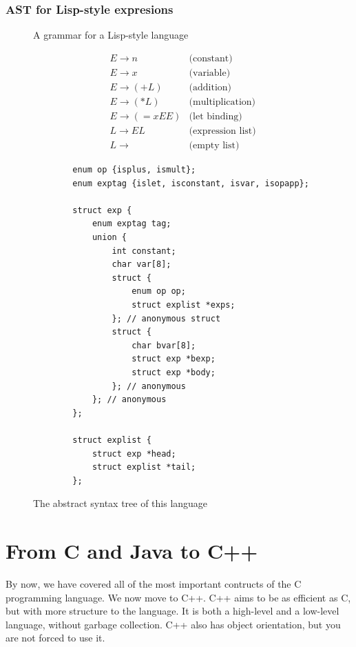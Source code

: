 \documentclass{article}
\begin{document}
	\subsubsection{AST for Lisp-style expresions}
	
	\begin{figure}[ht]
		\begin{minipage}[t]{0.45\textwidth}
		\caption{A grammar for a Lisp-style language}
		\begin{align*}
		&E \rightarrow n  &\text{(constant)} \\
		&E \rightarrow x  &\text{(variable)} \\
		&E \rightarrow (+ L)  &\text{(addition)} \\
		&E \rightarrow (* L)  &\text{(multiplication)} \\
		&E \rightarrow (= x E E)  &\text{(let binding)} \\
		&L \rightarrow E L	 &\text{(expression list)} \\
		&L \rightarrow		&\text{(empty list)}
		\end{align*}
		\end{minipage}
		\hfill
		\begin{minipage}[t]{0.45\textwidth}
		\caption{The abstract syntax tree of this language}
		\begin{verbatim}
		enum op {isplus, ismult};
		enum exptag {islet, isconstant, isvar, isopapp};
		
		struct exp {
		    enum exptag tag;
		    union {
		        int constant;
		        char var[8];
		        struct {
		            enum op op;
		            struct explist *exps;
		        }; // anonymous struct
		        struct {
		            char bvar[8];
		            struct exp *bexp;
		            struct exp *body;
		        }; // anonymous
		    }; // anonymous
		};
		
		struct explist {
		    struct exp *head;
		    struct explist *tail;
		};
		\end{verbatim}
		\end{minipage}			
	\end{figure}		
		
	
	\section{From C and Java to C++}
	By now, we have covered all of the most important contructs of the C programming language. We now move to C++. C++ aims to be as efficient as C, but with more structure to the language. It is both a high-level and a low-level language, without garbage collection. C++ also has object orientation, but you are not forced to use it.
	
\end{document}
